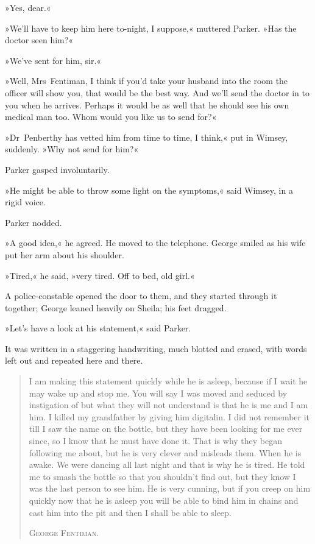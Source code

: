 »Yes, dear.«

»We'll have to keep him here to-night, I suppose,« muttered Parker. »Has the doctor seen him?«

»We've sent for him, sir.«

»Well, Mrs~Fentiman, I think if you'd take your husband into the room the officer will show you, that would be the best way. And we'll send the doctor in to you when he arrives. Perhaps it would be as well that he should see his own medical man too. Whom would you like us to send for?«

»Dr~Penberthy has vetted him from time to time, I think,« put in Wimsey, suddenly. »Why not send for him?«

Parker gasped involuntarily.

»He might be able to throw some light on the symptoms,« said Wimsey, in a rigid voice.

Parker nodded.

»A good idea,« he agreed. He moved to the telephone. George smiled as his wife put her arm about his shoulder.

»Tired,« he said, »very tired. Off to bed, old girl.«

A police-constable opened the door to them, and they started through it together; George leaned heavily on Sheila; his feet dragged.

»Let's have a look at his statement,« said Parker.

It was written in a staggering handwriting, much blotted and erased, with words left out and repeated here and there.

\begin{quote}
I am making this statement quickly while he is asleep, because if I wait he may wake up and stop me. You will say I was moved and seduced by instigation of but what they will not understand is that he is me and I am him. I killed my grandfather by giving him digitalin. I did not remember it till I saw the name on the bottle, but they have been looking for me ever since, so I know that he must have done it. That is why they began following me about, but he is very clever and misleads them. When he is awake. We were dancing all last night and that is why he is tired. He told me to smash the bottle so that you shouldn't find out, but they know I was the last person to see him. He is very cunning, but if you creep on him quickly now that he is asleep you will be able to bind him in chains and cast him into the pit and then I shall be able to sleep.
\begin{flushright}
\textsc{George Fentiman.}
\end{flushright}
\end{quote}

